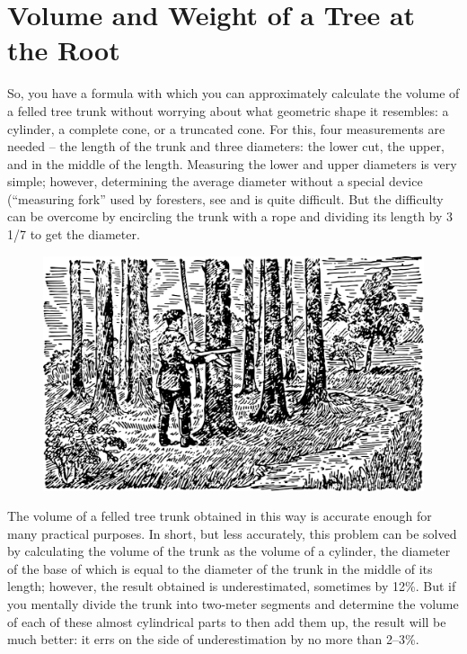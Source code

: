 \section{Volume and Weight of a Tree at the Root}
\label{sec-1.12}

So, you have a formula with which you can approximately calculate the volume of a felled tree trunk without worrying about what geometric shape it resembles: a cylinder, a complete cone, or a truncated cone. For this, four measurements are needed -- the length of the trunk and three diameters: the lower cut, the upper, and in the middle of the length. Measuring the lower and upper diameters is very simple; however, determining the average diameter without a special device (``measuring fork'' used by foresters, see  and  is quite difficult. But the difficulty can be overcome by encircling the trunk with a rope and dividing its length by 3 1/7 to get the diameter.

\begin{figure}[h!]
\centering
\includegraphics[width=\textwidth]{figures/ch-01/fig-01-19.pdf}
\end{figure}


The volume of a felled tree trunk obtained in this way is accurate enough for many practical purposes. In short, but less accurately, this problem can be solved by calculating the volume of the trunk as the volume of a cylinder, the diameter of the base of which is equal to the diameter of the trunk in the middle of its length; however, the result obtained is underestimated, sometimes by 12\%. But if you mentally divide the trunk into two-meter segments and determine the volume of each of these almost cylindrical parts to then add them up, the result will be much better: it errs on the side of underestimation by no more than 2–3\%.

